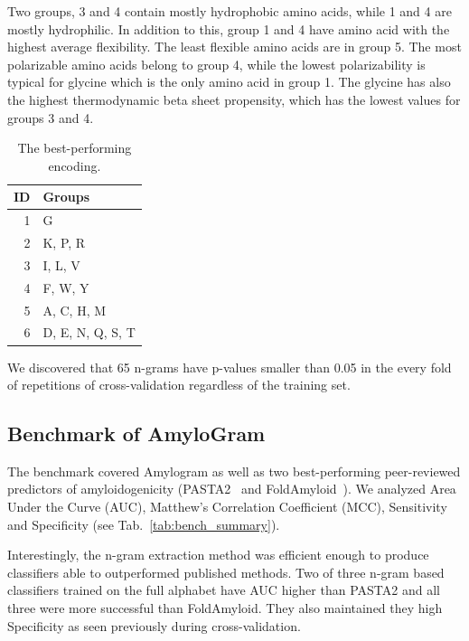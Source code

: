 \documentclass{bioinfo}
\begin{document}
Two groups, 3 and 4 contain mostly hydrophobic amino acids, while 1 and 4 are 
mostly hydrophilic. In addition to this, group 1 and 4 have amino acid with the 
highest average flexibility. The least flexible amino acids are in group 5. The 
most polarizable amino acids belong to group 4, while the lowest polarizability 
is typical for glycine which is the only amino acid in group 1. The glycine 
has also the highest thermodynamic beta sheet propensity, which has the lowest 
values for groups 3 and 4.

\begin{table}[ht]
\centering
\caption{The best-performing encoding.} 
\label{tab:best_enc}
\begin{tabular}{rl}
\toprule
ID & Groups \\ 
\midrule
  1 & G \\ 
\rowcolor[gray]{0.85}  2 & K, P, R \\ 
3 & I, L, V \\ 
\rowcolor[gray]{0.85}  4 & F, W, Y \\ 
5 & A, C, H, M \\ 
\rowcolor[gray]{0.85}  6 & D, E, N, Q, S, T \\ 
\bottomrule
\end{tabular}
\end{table}

We discovered that 65 n-grams have p-values smaller than 0.05 in the every 
fold of repetitions of cross-validation regardless of the training set. 

  


\subsection{Benchmark of AmyloGram}

The benchmark covered Amylogram as well as two best-performing peer-reviewed 
predictors of amyloidogenicity (PASTA2~\citep{walsh_pasta_2014} and 
FoldAmyloid~\citep{garbuzynskiy_foldamyloid:_2010}). We analyzed Area Under the 
Curve (AUC), Matthew's Correlation Coefficient (MCC), Sensitivity and 
Specificity (see Tab.~\ref{tab:bench_summary}).
    
  Interestingly, the n-gram extraction method was efficient enough to produce 
classifiers able to outperformed published methods. Two of three n-gram based 
classifiers trained on the full alphabet have AUC higher than PASTA2 and all 
three were more successful than FoldAmyloid. They also maintained they high 
Specificity as seen previously during cross-validation.
    
\end{document}
